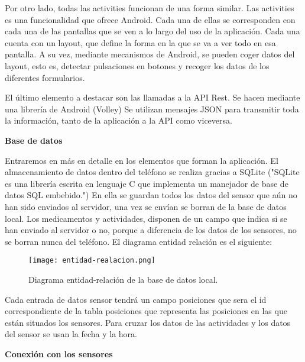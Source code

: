 \documentclass[11pt,spanish]{article}
\begin{document}
Por otro lado, todas las activities funcionan de una forma similar. Las activities es una funcionalidad que ofrece Android. Cada una de ellas se corresponden con cada una de las pantallas que se ven a lo largo del uso de la aplicación. Cada una cuenta con un layout, que define la forma en la que se va a ver todo en esa pantalla. A su vez, mediante mecanismos de Android, se pueden coger datos del layout, esto es, detectar pulsaciones en botones y recoger los datos de los diferentes formularios.
\newline

El último elemento a destacar son las llamadas a la API Rest. Se hacen mediante una librería de Android (Volley) Se utilizan mensajes JSON para transmitir toda la información, tanto de la aplicación a la API como viceversa.
\newline

{\bf Base de datos}
\newline
\newline

Entraremos en más en detalle en los elementos que forman la aplicación. El almacenamiento de datos dentro del teléfono se realiza gracias a SQLite ("SQLite es una librería escrita en lenguaje C que implementa un manejador de base de datos SQL embebido.") En ella se guardan todos los datos del sensor que aún no han sido enviados al servidor, una vez se envían se borran de la base de datos local. Los medicamentos y actividades,  disponen de un campo que indica si se han enviado al servidor o no, porque a diferencia de los datos de los sensores, no se borran nunca del teléfono. El diagrama entidad relación es el siguiente:
\newline

\begin{figure}[h!]
\centering
\texttt{[image: entidad-realacion.png]}
\caption{Diagrama entidad-relación de la base de datos local.}
\end{figure}
\newpage

Cada entrada de datos sensor tendrá un campo posiciones que sera el id correspondiente de la tabla posiciones que representa las posiciones en las que están situados los sensores. Para cruzar los datos de las actividades y los datos del sensor se usan la fecha y la hora. 
\newline

{\bf Conexión con los sensores}
\newline
\newline
\end{document}
